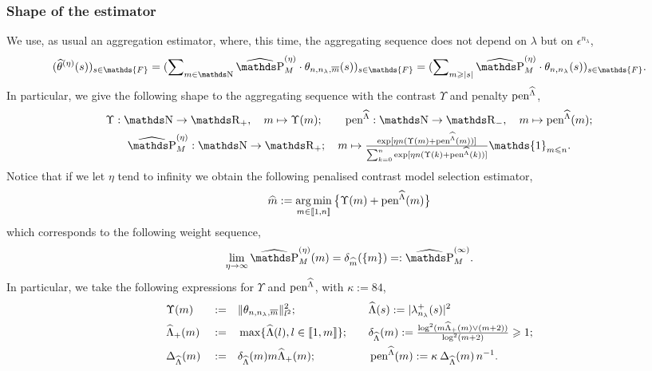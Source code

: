 \subsubsection{Shape of the estimator}
\begin{de*}
We use, as usual an aggregation estimator, where, this time, the aggregating sequence does not depend on $\lambda$ but on $\epsilon^{n_{\lambda}}$,
\begin{equation*}
(\widehat{\theta}^{(\eta)}(s))_{s \in \mathds{F}} = (\sum\nolimits_{m \in \N} \widehat{\P}_{M}^{(\eta)} \cdot \theta_{n, n_{\lambda}, \overline{m}}(s))_{s \in \mathds{F}} = (\sum\nolimits_{m \geq \vert s \vert} \widehat{\P}_{M}^{(\eta)} \cdot \theta_{n, n_{\lambda}}(s))_{s \in \mathds{F}}.
\end{equation*}
In particular, we give the following shape to the aggregating sequence with the contrast $\Upsilon$ and penalty $\pen^{\widehat{\Lambda}}$,
\begin{multline*}
\Upsilon : \N \to \R_{+}, \quad m \mapsto \Upsilon(m); \qquad \pen^{\widehat{\Lambda}} : \N \to \R_{-}, \quad m \mapsto \pen^{\widehat{\Lambda}}(m);\\
\widehat{\P}_{M}^{(\eta)} : \N \to \R_{+}; \quad m \mapsto \tfrac{\exp[\eta n (\Upsilon(m) + \pen^{\widehat{\Lambda}}(m))]}{\sum\nolimits_{k = 0}^{n} \exp[\eta n (\Upsilon(k) + \pen^{\widehat{\Lambda}}(k))]} \mathds{1}_{m \leq n}.
\end{multline*}
Notice that if we let $\eta$ tend to infinity we obtain the following penalised contrast model selection estimator,
\begin{equation*}
  \hDi:=\argmin_{\Di\in\nset{1,\ssY}} \big\{\Upsilon(m)+\peneSv\big\}
\end{equation*}
which corresponds to the following weight sequence,
\begin{equation*}
  \lim_{\rWc\to\infty}\erWe=\dirac[\hDi](\{\Di\})=:\widehat{\P}_{M}^{(\infty)}.
\end{equation*}
In particular, we take the following expressions for $\Upsilon$ and $\pen^{\widehat{\Lambda}}$, with $\kappa := 84$,
\begin{alignat*}{4}
  & \Upsilon(m) && := && \Vert \theta_{n, n_{\lambda}, \overline{m}}\Vert_{l^{2}}^{2}; && \quad \eiSv[(s)]:= \vert \hfedfmpI[(s)] \vert ^2\\
    & \meiSv && := && \max\{\eiSv[(l)],l\in\nset{1,\Di}\}; && \quad \cmeiSv:=\tfrac{\log^{2}(\Di\meiSv\vee(\Di+2))}{\log^{2}(\Di+2)}\geq1;\\
    &\DipeneSv && := && \cmeiSv \Di \meiSv;&& \quad \peneSv:= \peneD.
  \end{alignat*}
\assEnd
\end{de*}

